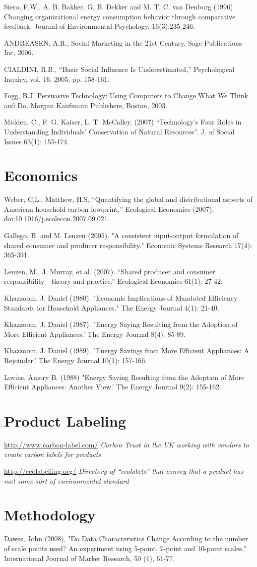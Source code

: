 Siero, F.W., A. B. Bakker, G. B. Dekker and M. T. C. van Denburg (1996) Changing organizational energy consumption behavior through comparative feedback. Journal of Environmental Psychology, 16(3):235-246.

ANDREASEN, A.R., Social Marketing in the 21st Century, Sage Publications Inc, 2006.

CIALDINI, R.B., “Basic Social Influence Is Underestimated,” Psychological Inquiry,  vol. 16, 2005, pp. 158-161.

Fogg, B.J.  Persuasive Technology: Using Computers to Change What We Think and Do.  Morgan Kaufmann Publishers, Boston, 2003.

Midden, C., F. G. Kaiser, L. T. McCalley. (2007) “Technology’s Four Roles in Understanding Individuals’ Conservation of Natural Resources”. J. of Social Issues 63(1): 155-174.


\section{Economics}
Weber, C.L., Matthew, H.S, “Quantifying the global and distributional 
aspects of American household carbon footprint,” Ecological Economics 
(2007), doi:10.1016/j.ecolecon.2007.09.021. 

Gallego, B. and M. Lenzen (2005). "A consistent input-output formulation of shared consumer and producer responsibility." Economic Systems Research 17(4): 
365-391.

Lenzen, M., J. Murray, et al. (2007). ``Shared producer and consumer responsibility - theory and practice.'' Ecological Economics 61(1): 27-42.

Khazzoom, J. Daniel (1980). "Economic Implications of Mandated Efficiency Standards for Household Appliances." The Energy Journal 4(1): 21-40.

Khazzoom, J. Daniel (1987). "Energy Saying Resulting from the Adoption of More Efficient Appliances.' The Energy Journal 8(4): 85-89.

Khazzoom, J. Daniel (1989). "Energy Savings from More Efficient Appliances: A Rejoinder.' The Energy Journal 10(1): 157-166.

Lovins, Amory B. (1988) "Energy Saving Resulting from the Adoption of More Efficient Appliances: Another View.' The Energy Journal 9(2): 155-162.


\section{Product Labeling}

\url{http://www.carbon-label.com/} \emph{Carbon Trust in the UK working with vendors to create carbon labels for products}

\url{http://ecolabelling.org/} \emph{Directory of ``ecolabels'' that convey that a product has met some sort of environmental standard}

\section{Methodology}
Dawes, John (2008), "Do Data Characteristics Change According to the number of scale points used? An experiment using 5-point, 7-point and 10-point scales," International Journal of Market Research, 50 (1), 61-77.